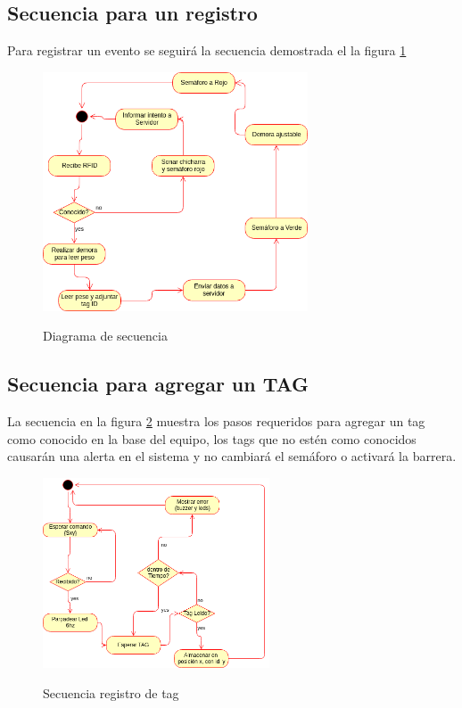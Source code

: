 \subsection{Secuencia para un registro}
Para registrar un evento se seguir\'a la secuencia demostrada el la figura \ref{fig:sequence-elect}
\begin{figure}[h!]
	\caption{Diagrama de secuencia}
	\includegraphics[width=0.7\textwidth]{images/diagrama_secuencia_electronica.png}
	\label{fig:sequence-elect}
\end{figure}

\subsection{Secuencia para agregar un TAG}
La secuencia en la figura \ref{fig:seq-tag} muestra los pasos requeridos para agregar un tag como conocido en la base del equipo, 
los tags que no estén como conocidos causarán una alerta en el sistema y no cambiará el semáforo o activará la barrera.
\begin{figure}[h!]
	\caption{Secuencia registro de tag}
	\includegraphics[width=0.6\textwidth]{images/secuencia-agregar-tag.png}
	\label{fig:seq-tag}
\end{figure}

